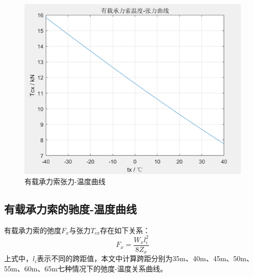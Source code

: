 \begin{figure}[h]
	\centering
	\includegraphics[width=0.7\linewidth]{figures/有载承力索张力-温度曲线}
	\caption{有载承力索张力-温度曲线}
	\label{fig:有载承力索张力-温度曲线}
\end{figure}

\subsection{有载承力索的驰度-温度曲线}
有载承力索的弛度$F_x$与张力$T_{cx}$存在如下关系：
$$
F_x=\frac{W_xl_{i}^{2}}{8Z_x}
$$
上式中，$l_i$表示不同的跨距值，本文中计算跨距分别为35m、40m、45m、50m、55m、60m、65m七种情况下的弛度-温度关系曲线。

